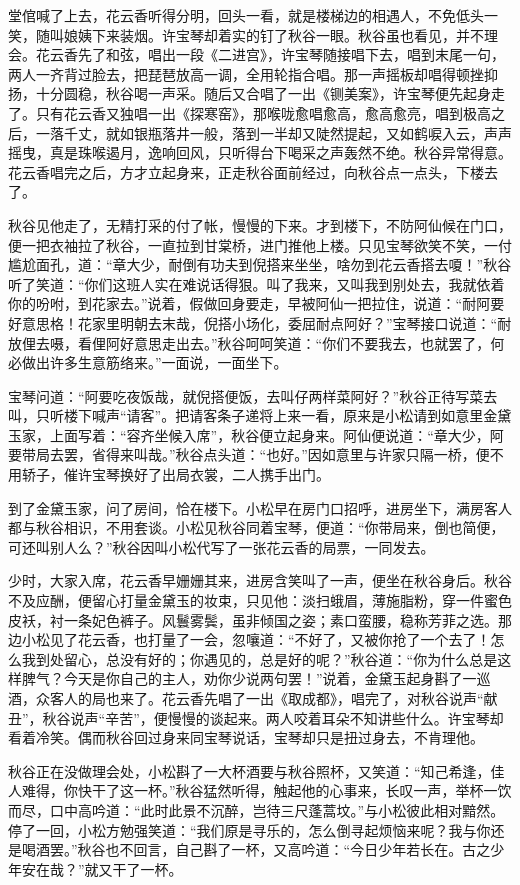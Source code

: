 \documentclass[12pt,UTF8]{ctexbook}
\begin{document}
堂倌喊了上去，花云香听得分明，回头一看，就是楼梯边的相遇人，不免低头一笑，随叫娘姨下来装烟。许宝琴却着实的钉了秋谷一眼。秋谷虽也看见，并不理会。花云香先了和弦，唱出一段《二进宫》，许宝琴随接唱下去，唱到末尾一句，两人一齐背过脸去，把琵琶放高一调，全用轮指合唱。那一声摇板却唱得顿挫抑扬，十分圆稳，秋谷喝一声采。随后又合唱了一出《铡美案》，许宝琴便先起身走了。只有花云香又独唱一出《探寒窑》，那喉咙愈唱愈高，愈高愈亮，唱到极高之后，一落千丈，就如银瓶落井一般，落到一半却又陡然提起，又如鹤唳入云，声声摇曳，真是珠喉遏月，逸响回风，只听得台下喝采之声轰然不绝。秋谷异常得意。花云香唱完之后，方才立起身来，正走秋谷面前经过，向秋谷点一点头，下楼去了。

秋谷见他走了，无精打采的付了帐，慢慢的下来。才到楼下，不防阿仙候在门口，便一把衣袖拉了秋谷，一直拉到甘棠桥，进门推他上楼。只见宝琴欲笑不笑，一付尴尬面孔，道：“章大少，耐倒有功夫到倪搭来坐坐，啥勿到花云香搭去嗄！”秋谷听了笑道：“你们这班人实在难说话得狠。叫了我来，又叫我到别处去，我就依着你的吩咐，到花家去。”说着，假做回身要走，早被阿仙一把拉住，说道：“耐阿要好意思格！花家里明朝去末哉，倪搭小场化，委屈耐点阿好？”宝琴接口说道：“耐放俚去嗫，看俚阿好意思走出去。”秋谷呵呵笑道：“你们不要我去，也就罢了，何必做出许多生意筋络来。”一面说，一面坐下。

宝琴问道：“阿要吃夜饭哉，就倪搭便饭，去叫仔两样菜阿好？”秋谷正待写菜去叫，只听楼下喊声“请客”。把请客条子递将上来一看，原来是小松请到如意里金黛玉家，上面写着：“容齐坐候入席”，秋谷便立起身来。阿仙便说道：“章大少，阿要带局去罢，省得来叫哉。”秋谷点头道：“也好。”因如意里与许家只隔一桥，便不用轿子，催许宝琴换好了出局衣裳，二人携手出门。

到了金黛玉家，问了房间，恰在楼下。小松早在房门口招呼，进房坐下，满房客人都与秋谷相识，不用套谈。小松见秋谷同着宝琴，便道：“你带局来，倒也简便，可还叫别人么？”秋谷因叫小松代写了一张花云香的局票，一同发去。

少时，大家入席，花云香早姗姗其来，进房含笑叫了一声，便坐在秋谷身后。秋谷不及应酬，便留心打量金黛玉的妆束，只见他：淡扫蛾眉，薄施脂粉，穿一件蜜色皮袄，衬一条妃色裤子。风鬟雾鬓，虽非倾国之姿；素口蛮腰，稳称芳菲之选。那边小松见了花云香，也打量了一会，忽嚷道：“不好了，又被你抢了一个去了！怎么我到处留心，总没有好的；你遇见的，总是好的呢？”秋谷道：“你为什么总是这样脾气？今天是你自己的主人，劝你少说两句罢！”说着，金黛玉起身斟了一巡酒，众客人的局也来了。花云香先唱了一出《取成都》，唱完了，对秋谷说声“献丑”，秋谷说声“辛苦”，便慢慢的谈起来。两人咬着耳朵不知讲些什么。许宝琴却看着冷笑。偶而秋谷回过身来同宝琴说话，宝琴却只是扭过身去，不肯理他。

秋谷正在没做理会处，小松斟了一大杯酒要与秋谷照杯，又笑道：“知己希逢，佳人难得，你快干了这一杯。”秋谷猛然听得，触起他的心事来，长叹一声，举杯一饮而尽，口中高吟道：“此时此景不沉醉，岂待三尺蓬蒿坟。”与小松彼此相对黯然。停了一回，小松方勉强笑道：“我们原是寻乐的，怎么倒寻起烦恼来呢？我与你还是喝酒罢。”秋谷也不回言，自己斟了一杯，又高吟道：“今日少年若长在。古之少年安在哉？”就又干了一杯。
\end{document}
